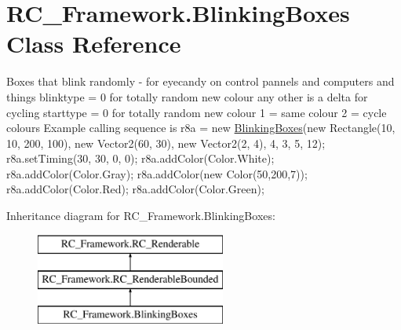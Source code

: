 \hypertarget{class_r_c___framework_1_1_blinking_boxes}{}\section{R\+C\+\_\+\+Framework.\+Blinking\+Boxes Class Reference}
\label{class_r_c___framework_1_1_blinking_boxes}


Boxes that blink randomly -\/ for eyecandy on control pannels and computers and things blinktype = 0 for totally random new colour any other is a delta for cycling starttype = 0 for totally random new colour 1 = same colour 2 = cycle colours Example calling sequence is r8a = new \mbox{\hyperlink{class_r_c___framework_1_1_blinking_boxes}{Blinking\+Boxes}}(new Rectangle(10, 10, 200, 100), new Vector2(60, 30), new Vector2(2, 4), 4, 3, 5, 12); r8a.\+set\+Timing(30, 30, 0, 0); r8a.\+add\+Color(Color.\+White); r8a.\+add\+Color(Color.\+Gray); r8a.\+add\+Color(new Color(50,200,7)); r8a.\+add\+Color(Color.\+Red); r8a.\+add\+Color(Color.\+Green);  


Inheritance diagram for R\+C\+\_\+\+Framework.\+Blinking\+Boxes\+:\begin{figure}[H]
\begin{center}
\leavevmode
\includegraphics[height=3.000000cm]{class_r_c___framework_1_1_blinking_boxes}
\end{center}
\end{figure}
